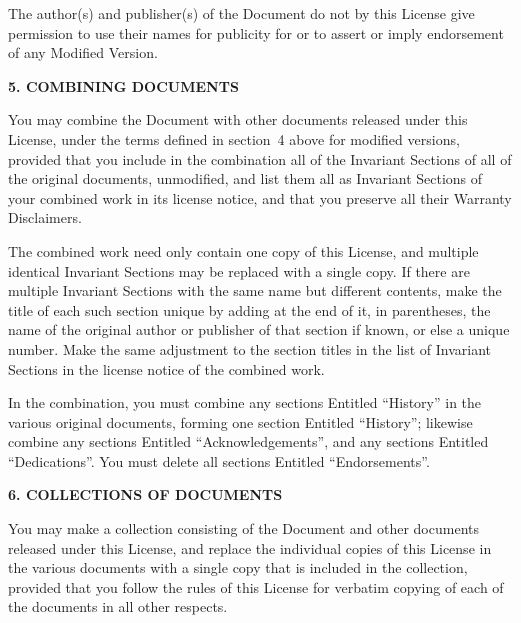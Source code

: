 \documentclass[a4paper,11pt,oneside]{book}
\begin{document}
The author(s) and publisher(s) of the Document do not by this License
give permission to use their names for publicity for or to assert or
imply endorsement of any Modified Version.


\begin{center}
	{\Large\bf 5. COMBINING DOCUMENTS\par}
\end{center}


You may combine the Document with other documents released under this
License, under the terms defined in section~4 above for modified
versions, provided that you include in the combination all of the
Invariant Sections of all of the original documents, unmodified, and
list them all as Invariant Sections of your combined work in its
license notice, and that you preserve all their Warranty Disclaimers.

The combined work need only contain one copy of this License, and
multiple identical Invariant Sections may be replaced with a single
copy.  If there are multiple Invariant Sections with the same name but
different contents, make the title of each such section unique by
adding at the end of it, in parentheses, the name of the original
author or publisher of that section if known, or else a unique number.
Make the same adjustment to the section titles in the list of
Invariant Sections in the license notice of the combined work.

In the combination, you must combine any sections Entitled ``History''
in the various original documents, forming one section Entitled
``History''; likewise combine any sections Entitled ``Acknowledgements'',
and any sections Entitled ``Dedications''.  You must delete all sections
Entitled ``Endorsements''.

\begin{center}
	{\Large\bf 6. COLLECTIONS OF DOCUMENTS\par}
\end{center}

You may make a collection consisting of the Document and other documents
released under this License, and replace the individual copies of this
License in the various documents with a single copy that is included in
the collection, provided that you follow the rules of this License for
verbatim copying of each of the documents in all other respects.
\end{document}
